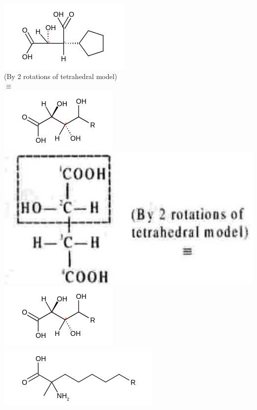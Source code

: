 \documentclass[10pt]{article}
\begin{document}
\includegraphics{smile-0f70ea90730c853a2cf347789ce83fa9209faec3}\\
(By 2 rotations of tetrahedral model)\\
$\equiv$\\
\includegraphics{smile-28f3d1f261b2226b21957649d647aa3e20373bec}\\
\includegraphics[max width=\textwidth, center]{2025_01_28_8470952b98110cec3aabg-167(4)}\\
\includegraphics{smile-8115087249cd51767639684fed7e4dc4c08430bf}\\
\includegraphics{smile-b4d1f99bd6c8d84c601f30e41121065e0625b46f}\\
\end{document}
